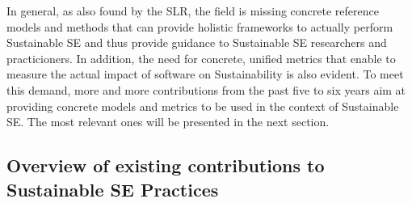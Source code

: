 \documentclass[oribibl]{llncs}
\begin{document}
In general, as also found by the SLR, the field is missing concrete reference models and methods that can provide holistic frameworks to actually perform Sustainable SE \cite{penzenstadler_sustainability_2012} and thus provide guidance to Sustainable SE researchers and practicioners. %
In addition, the need for concrete, unified metrics that enable to measure the actual impact of software on Sustainability is also evident. %
To meet this demand, more and more contributions from the past five to six years aim at providing concrete models and metrics to be used in the context of Sustainable SE. The most relevant ones will be presented in the next section.

\subsection{Overview of existing contributions to Sustainable SE Practices\label{overviewContributions}}%
\end{document}
